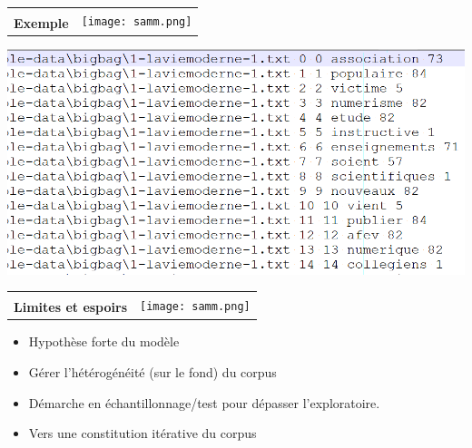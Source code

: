 \documentclass[12pt]{beamer}
\begin{document}
\begin{frame}
\begin{tabular}{b{7cm}l}
& \multirow{2}{*}{\texttt{[image: samm.png]}}\\ {\large \textbf{Exemple}}& 
\end{tabular}

\vspace{1.5cm}

\includegraphics[scale=0.25]{code4-mots.png}

\end{frame}

\begin{frame}

\begin{tabular}{b{7cm}l}
& \multirow{2}{*}{\texttt{[image: samm.png]}}\\ {\large \textbf{Limites et espoirs}}& 
\end{tabular}

\vspace{2cm}


\begin{itemize}
	\item Hypothèse forte du modèle
	\item Gérer l'hétérogénéité (sur le fond) du corpus
	\item Démarche en échantillonnage/test pour dépasser l'exploratoire.
	\item Vers une constitution itérative du corpus
\end{itemize}



\end{frame}
\end{document}
